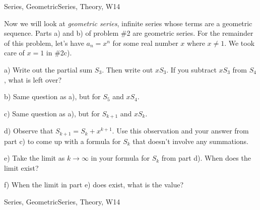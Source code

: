 \begin{tagblock}{Series, GeometricSeries, Theory, W14}
\begin{question}

Now we will look at \textit{geometric series}, infinite series whose terms are a geometric sequence. Parts a) and b) of problem \#2 are geometric series. For the remainder of this problem, let's have $a_n=x^n$ for some real number $x$ where $x\ne 1$. We took care of $x=1$ in \#2c).

\bigskip

a) Write out the partial sum $S_3$. Then write out $xS_3$. If you subtract $xS_3$ from $S_4$, what is left over? 

\bigskip

b) Same question as a), but for $S_5$ and $xS_4$. 

\bigskip

c) Same question as a), but for $S_{k+1}$ and $xS_{k}$. 

\bigskip

d) Observe that $S_{k+1}=S_k+x^{k+1}$. Use this observation and your answer from part c) to come up with a formula for $S_k$ that doesn't involve any summations. 

\bigskip

e) Take the limit as $k\to\infty$ in your formula for $S_k$ from part d). When does the limit exist? 

\bigskip

f) When the limit in part e) does exist, what is the value?
	
	
\begin{tags}
	    Series, GeometricSeries, Theory, W14
\end{tags}
	
\begin{diary}
	    
\end{diary}
	
\begin{solution}
	   
\end{solution}
	
\end{question}

\end{tagblock}

 


